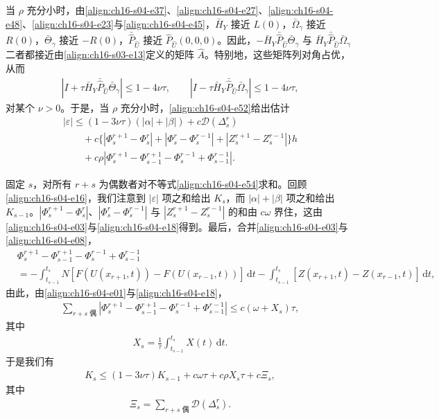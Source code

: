 ﻿\documentclass[../../main.tex]{subfiles}
\begin{document}
当 $\rho$ 充分小时，由\eqref{align:ch16-s04-e37}、\eqref{align:ch16-s04-e27}、\eqref{align:ch16-s04-e48}、\eqref{align:ch16-s04-e23}与\eqref{align:ch16-s04-e45}，$\bar H_Y$ 接近 $L(0)$，$\bar\Omega_\gamma$ 接近 $R(0)$，$\bar\Theta_\gamma$ 接近 $-R(0)$，$\bar{\hat P}_{\hat U}$ 接近 $\hat P_{\hat U}(0,0,0)$。因此，$-\bar H_Y\bar{\hat P}_{\hat U}\bar\Theta_\gamma$ 与 $\bar H_Y\bar{\hat P}_{\hat U}\bar\Omega_\gamma$ 二者都接近由\eqref{align:ch16-s03-e13}定义的矩阵 $\hat A$。特别地，这些矩阵列对角占优，从而
\begin{align}
|I+\tau\bar H_Y\bar{\hat P}_{\hat U}\bar\Theta_\gamma|\leqslant1-4\nu\tau,\qquad|I-\tau\bar H_Y\bar{\hat P}_{\hat U}\bar\Omega_\gamma|\leqslant1-4\nu\tau,
\label{align:ch16-s04-e53}
\end{align}
对某个 $\nu>0$。于是，当 $\rho$ 充分小时，\eqref{align:ch16-s04-e52}给出估计
\begin{align}
|\varepsilon|\leqslant(1-3\nu\tau)(|\alpha|+|\beta|)+c\mathscr{D}(\Delta_s^r)\nonumber\\
\qquad+c\{|\Phi_s^{r+1}-\Phi_s^r|+|\Phi_s^r-\Phi_s^{r-1}|+|Z_s^{r+1}-Z_s^{r-1}|\}h\nonumber\\
\qquad+c\rho|\Phi_s^{r+1}-\Phi_{s-1}^{r+1}-\Phi_s^{r-1}+\Phi_{s-1}^{r-1}|.
\label{align:ch16-s04-e54}
\end{align}

固定 $s$，对所有 $r+s$ 为偶数者对不等式\eqref{align:ch16-s04-e54}求和。回顾\eqref{align:ch16-s04-e16}，我们注意到 $|\varepsilon|$ 项之和给出 $K_s$，而 $|\alpha|+|\beta|$ 项之和给出 $K_{s-1}$。$|\Phi_s^{r+1}-\Phi_s^r|$、$|\Phi_s^r-\Phi_s^{r-1}|$ 与 $|Z_s^{r+1}-Z_s^{r-1}|$ 的和由 $c\omega$ 界住，这由\eqref{align:ch16-s04-e03}与\eqref{align:ch16-s04-e18}得到。最后，合并\eqref{align:ch16-s04-e03}与\eqref{align:ch16-s04-e08}，
\begin{align}
&\Phi_s^{r+1}-\Phi_{s-1}^{r+1}-\Phi_s^{r-1}+\Phi_{s-1}^{r-1}\nonumber\\
&=-\int_{t_{s-1}}^{t_s}N[F(U(x_{r+1},t))-F(U(x_{r-1},t))]\,\mathrm{d}t-\int_{t_{s-1}}^{t_s}[Z(x_{r+1},t)-Z(x_{r-1},t)]\,\mathrm{d}t,
\label{align:ch16-s04-e55}
\end{align}
由此，由\eqref{align:ch16-s04-e01}与\eqref{align:ch16-s04-e18}，
\begin{align}
\sum_{r+s\text{ 偶}}|\Phi_s^{r+1}-\Phi_{s-1}^{r+1}-\Phi_s^{r-1}+\Phi_{s-1}^{r-1}|\leqslant c(\omega+X_s)\tau,
\label{align:ch16-s04-e56}
\end{align}
其中
\begin{align}
X_s=\frac{1}{\tau}\int_{t_{s-1}}^{t_s}X(t)\,\mathrm{d}t.
\label{align:ch16-s04-e57}
\end{align}
于是我们有
\begin{align}
K_s\leqslant(1-3\nu\tau)K_{s-1}+c\omega\tau+c\rho X_s\tau+c\Xi_s,
\label{align:ch16-s04-e58}
\end{align}
其中
\begin{align}
\Xi_s=\sum_{r+s\text{ 偶}}\mathscr{D}(\Delta_s^r).
\label{align:ch16-s04-e59}
\end{align}
\end{document}
